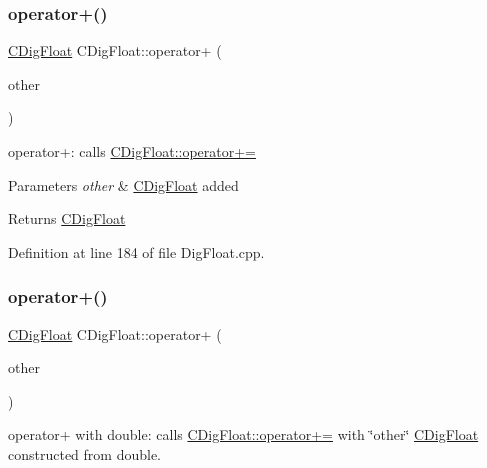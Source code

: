 \mbox{\label{classCDigFloat_a1009b21039c6d32ec4be755251679153}} 
\subsubsection{\texorpdfstring{operator+()}{operator+()}\hspace{0.1cm}{\footnotesize\ttfamily [1/2]}}
{\footnotesize\ttfamily \hyperlink{classCDigFloat}{C\+Dig\+Float} C\+Dig\+Float\+::operator+ (\begin{DoxyParamCaption}\item[{const \hyperlink{classCDigFloat}{C\+Dig\+Float} \&}]{other }\end{DoxyParamCaption})}



operator+\+: calls \hyperlink{classCDigFloat_a84b2ad9b4d1a75aae261074ed7c6fefe}{C\+Dig\+Float\+::operator+=} 


\begin{DoxyParams}{Parameters}
{\em other} & \hyperlink{classCDigFloat}{C\+Dig\+Float} added \\
\hline
\end{DoxyParams}
\begin{DoxyReturn}{Returns}
\hyperlink{classCDigFloat}{C\+Dig\+Float} 
\end{DoxyReturn}


Definition at line 184 of file Dig\+Float.\+cpp.

\mbox{\label{classCDigFloat_a7fd363bbeb039e11fcc2d1b0ca628173}} 
\subsubsection{\texorpdfstring{operator+()}{operator+()}\hspace{0.1cm}{\footnotesize\ttfamily [2/2]}}
{\footnotesize\ttfamily \hyperlink{classCDigFloat}{C\+Dig\+Float} C\+Dig\+Float\+::operator+ (\begin{DoxyParamCaption}\item[{const double}]{other }\end{DoxyParamCaption})}



operator+ with double\+: calls \hyperlink{classCDigFloat_a84b2ad9b4d1a75aae261074ed7c6fefe}{C\+Dig\+Float\+::operator+=} with \char`\"{}other\char`\"{} \hyperlink{classCDigFloat}{C\+Dig\+Float} constructed from double. 


